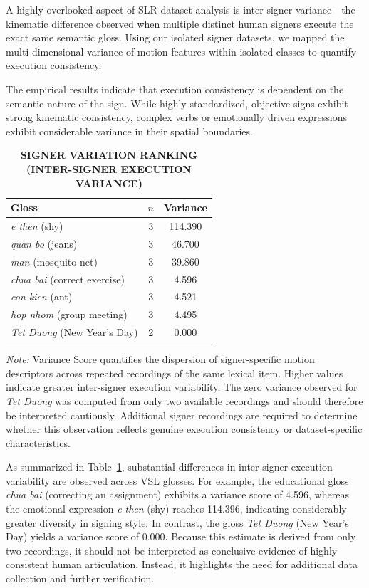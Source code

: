 \documentclass{ieeeaccess}
\begin{document}
A highly overlooked aspect of SLR dataset analysis is inter-signer variance—the kinematic difference observed when multiple distinct human signers execute the exact same semantic gloss. Using our isolated signer datasets, we mapped the multi-dimensional variance of motion features within isolated classes to quantify execution consistency.

The empirical results indicate that execution consistency is dependent on the semantic nature of the sign. While highly standardized, objective signs exhibit strong kinematic consistency, complex verbs or emotionally driven expressions exhibit considerable variance in their spatial boundaries. 

\begin{table}[!t]
\caption{\textbf{SIGNER VARIATION RANKING (INTER-SIGNER EXECUTION VARIANCE)}}
\label{tab:variation}

\centering
\small
\setlength{\tabcolsep}{10pt}

\begin{tabular}{|p{2.5cm}|c|c|}
\hline
\textbf{Gloss} &
\textbf{$n$} &
\textbf{Variance} \\
\hline
\emph{e then} (shy) & 3 & 114.390\\
\hline
\emph{quan bo} (jeans) & 3 & 46.700\\
\hline
\emph{man} (mosquito net) & 3 & 39.860 \\
\hline
\emph{chua bai} (correct exercise) & 3 & 4.596\\
\hline
\emph{con kien} (ant) & 3 & 4.521\\
\hline
\emph{hop nhom} (group meeting) & 3 & 4.495\\
\hline
\emph{Tet Duong} (New Year's Day) & 2 & 0.000\\
\hline
\end{tabular}
\end{table}

\noindent
\footnotesize
\textit{Note:}
Variance Score quantifies the dispersion of signer-specific motion descriptors across repeated recordings of the same lexical item. Higher values indicate greater inter-signer execution variability. The zero variance observed for \emph{Tet Duong} was computed from only two available recordings and should therefore be interpreted cautiously. Additional signer recordings are required to determine whether this observation reflects genuine execution consistency or dataset-specific characteristics.

As summarized in Table~\ref{tab:variation}, substantial differences in inter-signer execution variability are observed across VSL glosses. For example, the educational gloss \emph{chua bai} (correcting an assignment) exhibits a variance score of 4.596, whereas the emotional expression \emph{e then} (shy) reaches 114.396, indicating considerably greater diversity in signing style. In contrast, the gloss \emph{Tet Duong} (New Year's Day) yields a variance score of 0.000. Because this estimate is derived from only two recordings, it should not be interpreted as conclusive evidence of highly consistent human articulation. Instead, it highlights the need for additional data collection and further verification.
\end{document}
